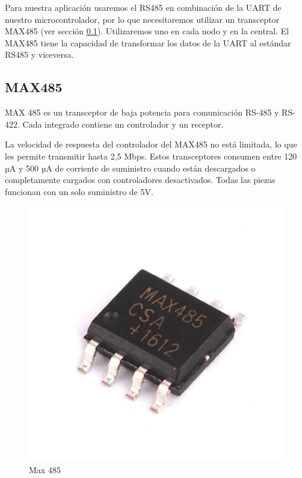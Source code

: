 Para nuestra aplicación usaremos el RS485 en combinación de la UART de nuestro microcontrolador, por lo que necesitaremos utilizar un transceptor MAX485 
(ver sección \ref{cap:max485}). Utilizaremos uno en cada nodo y en la central. El MAX485 tiene la capacidad de transformar los datos de la UART al estándar
RS485 y viceversa. \par

\subsection{MAX485} \label{cap:max485}

MAX 485 es un transceptor de baja potencia para comunicación RS-485 y RS-422. Cada integrado contiene un controlador y un receptor.\par 
La velocidad de respuesta del controlador del MAX485 no está limitada, lo que les permite transmitir hasta 2,5 Mbps. Estos transceptores
consumen entre 120 µA y 500 µA de corriente de suministro cuando están descargados o completamente cargados con controladores desactivados.
Todas las piezas funcionan con un solo suministro de 5V. 

\begin{figure}[htb]
	\centering
	\includegraphics[scale=0.5]{images/max485.jpg}
    \caption{Max 485}
	\label{fig:max485}
\end{figure}

